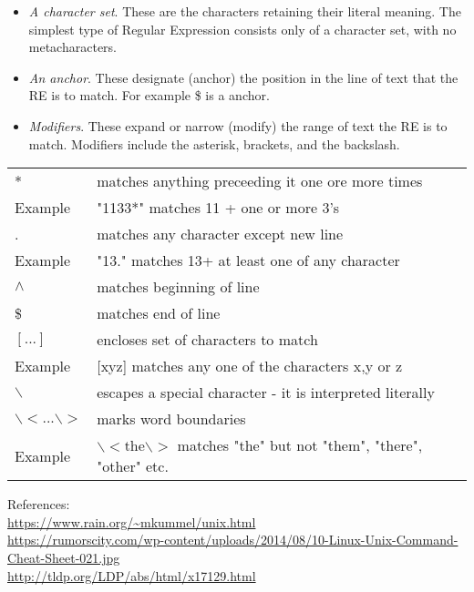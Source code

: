 \documentclass{article}
\begin{document}
\begin{itemize}
\item \textit{A character set}. These are the characters retaining their literal meaning. The simplest type of Regular Expression consists only of a character set, with no metacharacters.
\item \textit{An anchor}. These designate (anchor) the position in the line of text that the RE is to match. For example \$ is a anchor.
\item \textit{Modifiers}. These expand or narrow (modify) the range of text the RE is to match. Modifiers include the asterisk, brackets, and the backslash.
\end{itemize}

\begin{tabular}{ll}
* & matches anything preceeding it one ore more times \\ 
Example & "1133*" matches 11 + one or more 3's \\ 
. & matches any character except new line \\ 
Example & "13." matches 13+ at least one of any character \\ 
$\wedge$ & matches beginning of line \\ 
\$ & matches end of line \\ 
$[...]$ & encloses set of characters to match \\ 
Example & [xyz] matches any one of the characters x,y or z \\ 
$\backslash$ & escapes a special character - it is interpreted literally \\ 
 $\backslash < ...\backslash >$ & marks word boundaries \\ 			
Example &  $\backslash < \text{the} \backslash >$ matches "the" but not "them", "there", "other" etc. \\ 
\end{tabular} 

\vspace{50pt}



References:\\
\url{https://www.rain.org/~mkummel/unix.html} \\
\url{https://rumorscity.com/wp-content/uploads/2014/08/10-Linux-Unix-Command-Cheat-Sheet-021.jpg}\\
\url{http://tldp.org/LDP/abs/html/x17129.html}\\
\end{document}
